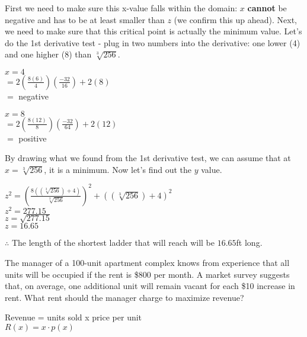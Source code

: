 \documentclass[12pt,fleqn]{book} %
\begin{document}
\noindent First we need to make sure this x-value falls within the domain: $x$ \textbf{cannot} be negative and has to be at least smaller than $z$ (we confirm this up ahead).
Next, we need to make sure that this critical point is actually the minimum value. Let's do the 1st derivative test - plug in two numbers
into the derivative: one lower (4) and one higher (8) than $\sqrt[3]{256}$.

\begin{multicols}{2}
    \begin{center}
        \underline{$x=4$} \\
        $=2(\frac{8(6)}{4})(\frac{-32}{16})+2(8)$ \\
        $=$ negative

        \columnbreak
        \underline{$x=8$}\\
        $=2(\frac{8(12)}{8})(\frac{-32}{64})+2(12)$ \\
        $=$ positive
    \end{center}
\end{multicols}

\noindent By drawing what we found from the 1st derivative test, we can assume that at $x=\sqrt[3]{256}$, it is a minimum. Now let's find out the $y$ value.

\begin{center}
    $z^2=(\frac{8((\sqrt[3]{256})+4)}{\sqrt[3]{256}})^2+((\sqrt[3]{256})+4)^2$ \\
    $z^2=277.15$ \\
    $z=\sqrt{277.15}$ \\
    $z=16.65$
\end{center}

\noindent $\therefore$ The length of the shortest ladder that will reach will be $16.65$ft long.

\vspace*{5mm}


\noindent\small{The manager of a 100-unit apartment complex knows from experience that all units will be occupied if the rent is \$800 per month. A market survey suggests
    that, on average, one additional unit will remain vacant for each \$10 increase in rent. What rent should the manager charge to maximize revenue?}

\begin{center}
    Revenue = units sold x price per unit \\
    $R(x) = x \cdot p(x)$
\end{center}
\end{document}
